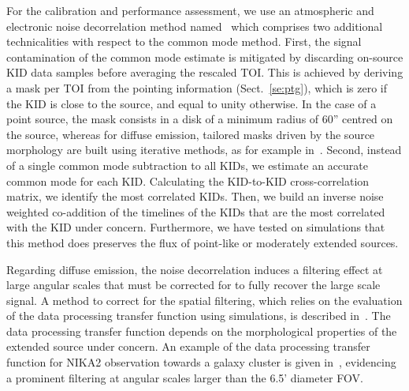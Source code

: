 {\lp For the calibration and performance assessment, we use an
atmospheric and electronic noise
decorrelation method named \cmoneb\, which comprises two
additional technicalities with respect to the common mode
method.} First, the signal contamination of the common mode estimate
is mitigated by discarding on-source KID data samples before averaging
the rescaled TOI. {\rev This is achieved by deriving a mask per TOI
from the pointing information (Sect.~\ref{se:ptg}), which is zero if
the KID is close to the source, and equal to unity otherwise. In the case of a
point source, the mask consists in a disk of a minimum radius of 60''
centred on the source, whereas for diffuse emission, tailored masks
driven by the source morphology are built using iterative methods, as
for example in~\citet{Ruppin2017}.}
Second, instead of a single common mode subtraction to
all KIDs, we estimate an accurate common mode for each
KID. Calculating the KID-to-KID cross-correlation matrix, we
identify the most correlated KIDs. Then, we build an
inverse noise weighted co-addition of the timelines of the %
KIDs that are the most correlated with the KID under
concern. Furthermore, we have tested on simulations that this method
does preserves the flux of {\lp point-like or moderately extended
sources.}

{\rev Regarding diffuse emission, the noise decorrelation induces a
filtering effect at large angular scales that must be corrected
for to fully recover the large scale signal. A method to correct for the
spatial filtering, which relies on the evaluation of the data
processing transfer function using simulations, is
described in~\citet{Adam2015}. The data processing transfer function
depends on the morphological properties of the extended source under
concern. %
An example of the data processing transfer function for
NIKA2 observation towards a galaxy cluster is given
in~\citet{Ruppin2018}, evidencing a prominent filtering at
angular scales larger than the 6.5' diameter FOV.} 

